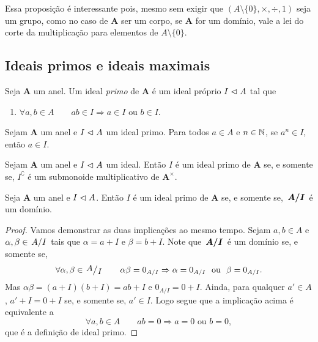 Essa proposição é interessante pois, mesmo sem exigir que $(A \setminus \{0\},\times,\div,1)$ seja um grupo, como no caso de $\bm A$ ser um corpo, se $\textbf{A}$ for um domínio, vale a lei do corte da multiplicação para elementos de $A \setminus \{0\}$.

\subsection{Ideais primos e ideais maximais}

\begin{definition}
	Seja $\bm A$ um anel. Um ideal \emph{primo} de $\bm A$ é um ideal próprio $I \mathrel{\lhd} A$ tal que
	\begin{enumerate}
	\item $\forall a,b \in A \qquad ab \in I \Rightarrow a \in I \text{\ \ ou\ \ } b \in I$.
	\end{enumerate}
\end{definition}

\begin{exercise}
Sejam $\bm A$ um anel e $I \mathrel{\lhd} A$ um ideal primo. Para todos $a \in A$ e $n \in \mathbb{N}$, se $a^n \in I$, então $a \in I$.
\end{exercise}

\begin{exercise}
Sejam $\bm A$ um anel e $I \mathrel{\lhd} A$ um ideal. Então $I$ é um ideal primo de $\bm A$ se, e somente se, $I^\complement$ é um submonoide multiplicativo de $\bm A^\times$.
\end{exercise}

\begin{theorem}
\label{teo:ide.prim.dom}
	Seja $\bm A$ um anel e $I \mathrel{\lhd} A$. Então $I$ é um ideal primo de $\bm A$ se, e somente se, $\bm{\quo{A}{I}}$ é um domínio.
\end{theorem}
\begin{proof}
	Vamos demonstrar as duas implicações ao mesmo tempo. Sejam $a,b \in A$ e $\alpha,\beta \in \quo{A}{I}$ tais que $\alpha=a+I$ e $\beta=b+I$. Note que $\bm{\quo{A}{I}}$ é um domínio se, e somente se,
	\begin{equation*}
	\forall \alpha,\beta \in \quo{A}{I} \qquad \alpha\beta=0_{A/I} \Rightarrow \alpha=0_{A/I} \text{\ \ ou\ \ } \beta=0_{A/I}.
	\end{equation*}
Mas $\alpha\beta=(a+I)(b+I)=ab+I$ e $0_{A/I}=0+I$. Ainda, para qualquer $a' \in A$, $a'+I=0+I$ se, e somente se, $a' \in I$. Logo segue que a implicação acima é equivalente a
	\begin{equation*}
	\forall a,b \in A \qquad ab=0 \Rightarrow a=0 \text{\ \ ou\ \ } b=0,
	\end{equation*}
que é a definição de ideal primo.
\end{proof}

